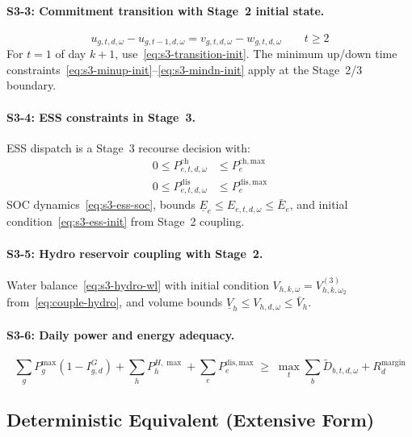 \documentclass[11pt]{article}
\newcommand{\Pch}{P^{\mathrm{ch}}}
\newcommand{\Pdis}{P^{\mathrm{dis}}}
\begin{document}
\paragraph{S3-3: Commitment transition with Stage~2 initial state.}
\begin{equation}\label{eq:s3-transition}
  u_{g,t,d,\omega} - u_{g,t-1,d,\omega}
  = v_{g,t,d,\omega} - w_{g,t,d,\omega}
  \qquad t \geq 2
\end{equation}
For $t = 1$ of day $k{+}1$, use~\eqref{eq:s3-transition-init}. The
minimum up/down time constraints~\eqref{eq:s3-minup-init}--\eqref{eq:s3-mindn-init}
apply at the Stage~2/3 boundary.

\paragraph{S3-4: ESS constraints in Stage~3.}
ESS dispatch is a Stage~3 recourse decision with:
\begin{align}
  0 \leq \Pch_{e,t,d,\omega} &\leq P^{\mathrm{ch,max}}_e
    \label{eq:s3-ess-ch}\\
  0 \leq \Pdis_{e,t,d,\omega} &\leq P^{\mathrm{dis,max}}_e
    \label{eq:s3-ess-dis}
\end{align}
SOC dynamics~\eqref{eq:s3-ess-soc}, bounds
$\underline{E}_e \leq E_{e,t,d,\omega} \leq \bar{E}_e$, and initial
condition~\eqref{eq:s3-ess-init} from Stage~2 coupling.

\paragraph{S3-5: Hydro reservoir coupling with Stage~2.}
Water balance~\eqref{eq:s3-hydro-wl} with initial
condition $V_{h,k,\omega} = V^{(3)}_{h,k,\omega_2}$
from~\eqref{eq:couple-hydro}, and volume bounds
$\underline{V}_h \leq V_{h,d,\omega} \leq \bar{V}_h$.

\paragraph{S3-6: Daily power and energy adequacy.}
\begin{equation}\label{eq:s3-adequacy}
  \sum_{g} P^{\max}_g (1-I^{G}_{g,d})
  + \sum_{h} P^{H,\max}_h
  + \sum_e P^{\mathrm{dis,max}}_e
  \;\geq\;
  \max_{t} \sum_{b}\tilde{D}_{b,t,d,\omega}
  + R^{\mathrm{margin}}_d
\end{equation}

\subsection{Deterministic Equivalent (Extensive Form)}
\label{sec:extensive}
\end{document}

